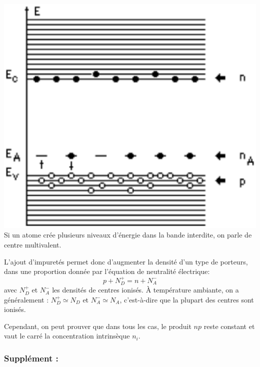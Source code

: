 \includegraphics[scale=0.3]{accepteur.eps}\\
Si un atome crée plusieurs niveaux d'énergie dans la bande interdite, on parle de centre multivalent.

L'ajout d'impuretés permet donc d'augmenter la densité d'un type de porteurs, dans une proportion donnée par l'équation de neutralité électrique:
\begin{equation}
p+N_D^+=n+N_A^-
\end{equation}
avec $N_D^+$ et $N_A^-$ les densités de centres ionisés. À température ambiante, on a généralement : $N_D^+ \simeq N_D$ et $N_A^- \simeq N_A$, c'est-à-dire que la plupart des centres sont ionisés. 

Cependant, on peut prouver que dans tous les cas, le produit $np$ reste constant et vaut le carré la concentration intrinsèque $n_i$.\\

\subsubsection{Supplément :}

